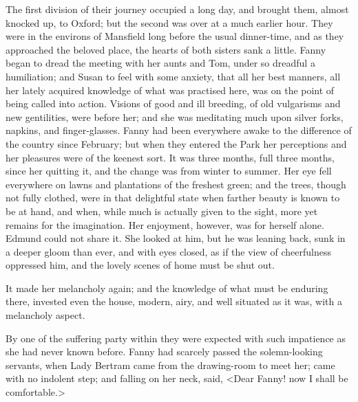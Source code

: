 The first division of their journey occupied a long day, and brought them, almost knocked up, to Oxford; but the second was over at a much earlier hour. They were in the environs of Mansfield long before the usual dinner-time, and as they approached the beloved place, the hearts of both sisters sank a little. Fanny began to dread the meeting with her aunts and Tom, under so dreadful a humiliation; and Susan to feel with some anxiety, that all her best manners, all her lately acquired knowledge of what was practised here, was on the point of being called into action. Visions of good and ill breeding, of old vulgarisms and new gentilities, were before her; and she was meditating much upon silver forks, napkins, and finger-glasses. Fanny had been everywhere awake to the difference of the country since February; but when they entered the Park her perceptions and her pleasures were of the keenest sort. It was three months, full three months, since her quitting it, and the change was from winter to summer. Her eye fell everywhere on lawns and plantations of the freshest green; and the trees, though not fully clothed, were in that delightful state when farther beauty is known to be at hand, and when, while much is actually given to the sight, more yet remains for the imagination. Her enjoyment, however, was for herself alone. Edmund could not share it. She looked at him, but he was leaning back, sunk in a deeper gloom than ever, and with eyes closed, as if the view of cheerfulness oppressed him, and the lovely scenes of home must be shut out.

It made her melancholy again; and the knowledge of what must be enduring there, invested even the house, modern, airy, and well situated as it was, with a melancholy aspect.

By one of the suffering party within they were expected with such impatience as she had never known before. Fanny had scarcely passed the solemn-looking servants, when Lady Bertram came from the drawing-room to meet her; came with no indolent step; and falling on her neck, said, <Dear Fanny! now I shall be comfortable.> 